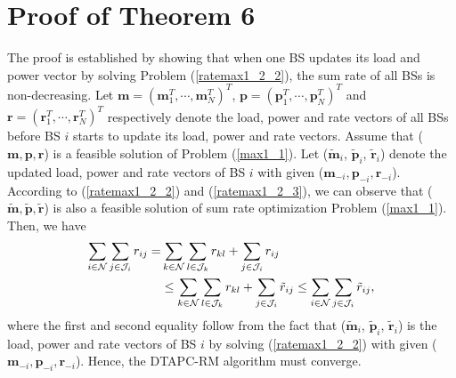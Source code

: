 \documentclass[journal]{IEEEtran}
\begin{document}

\section{Proof of Theorem 6}
The proof is established by showing that when one BS updates its load and power vector by solving Problem (\ref{ratemax1_2_2}), the sum rate of all BSs is non-decreasing.
Let $\pmb{m}=(\pmb{m}_1^T, \cdots, \pmb{m}_N^T)^T$, $\pmb{p}=(\pmb{p}_1^T, \cdots, \pmb{p}_N^T)^T$ and $\pmb{r}=(\pmb{r}_1^T, \cdots, \pmb{r}_N^T)^T$ respectively denote the load, power and rate vectors of all BSs before BS $i$ starts to update its load, power and rate vectors.
Assume that ($\pmb m, \pmb p, \pmb r$) is a feasible solution of Problem (\ref{max1_1}).
Let ($\pmb{\tilde m}_i$, $\pmb {\tilde p}_i$, $\pmb{\tilde r}_i$) denote the updated load, power and rate vectors of BS $i$ with given ($\pmb m_{-i}, \pmb p_{-i}, \pmb r_{-i}$).
According to (\ref{ratemax1_2_2}) and (\ref{ratemax1_2_3}), we can observe that ($\pmb {\tilde m}, \pmb {\tilde p}, \pmb {\tilde r}$) is also a feasible solution of sum rate optimization Problem (\ref{max1_1}).
Then, we have
\begin{subequations}
\begin{align}
\sum_{i \in \mathcal N} \sum_{j\in\mathcal J_i} r_{ij} =&
\sum_{k \in \mathcal N} \sum_{l\in\mathcal J_k} r_{kl}+ \sum_{j \in {\cal{J}}_i }r_{ij} \nonumber\\
&
\leq
\sum_{k \in \mathcal N} \sum_{l\in\mathcal J_k} r_{kl}+ \sum_{j \in {\cal{J}}_i }\tilde r_{ij}
\leq \sum_{i \in \mathcal N} \sum_{j\in\mathcal J_i} \tilde r_{ij}\nonumber,
\end{align}
\end{subequations}
where the first and second equality follow from the fact that ($\pmb{\tilde m}_i$, $\pmb {\tilde p}_i$, $\pmb{\tilde r}_i$) is the load, power and rate vectors of BS $i$ by solving (\ref{ratemax1_2_2}) with given ($\pmb m_{-i}, \pmb p_{-i}, \pmb r_{-i}$). Hence, the DTAPC-RM algorithm must converge.








\end{document}
